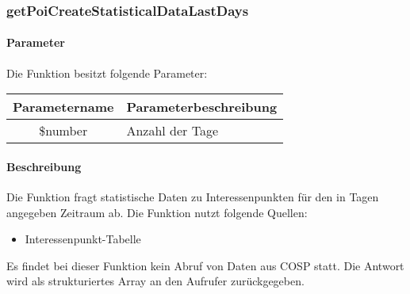 \subsubsection{getPoiCreateStatisticalDataLastDays}
\paragraph{Parameter} Die Funktion besitzt folgende Parameter:
\begin{table}[H]
	\begin{tabular}{|c|p{11cm}|}
		\hline
		\textbf{Parametername} & \textbf{Parameterbeschreibung} \\ \hline
		\$number & Anzahl der Tage \\ \hline
	\end{tabular}
\end{table}
\paragraph{Beschreibung} Die Funktion fragt statistische Daten  zu Interessenpunkten für den in Tagen angegeben Zeitraum ab. Die Funktion nutzt folgende Quellen:
\begin{itemize}
	\item Interessenpunkt-Tabelle
\end{itemize}
Es findet bei dieser Funktion kein Abruf von Daten aus {\glqq COSP\grqq} statt. Die Antwort wird als strukturiertes Array an den Aufrufer zurückgegeben.